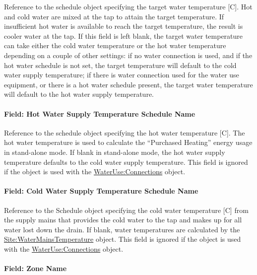 Reference to the schedule object specifying the target water temperature {[}C{]}. Hot and cold water are mixed at the tap to attain the target temperature. If insufficient hot water is available to reach the target temperature, the result is cooler water at the tap. If this field is left blank, the target water temperature can take either the cold water temperature or the hot water temperature depending on a couple of other settings: if no water connection is used, and if the hot water schedule is not set, the target temperature will default to the cold water supply temperature; if there is water connection used for the water use equipment, or there is a hot water schedule present, the target water temperature will default to the hot water supply temperature.

\paragraph{Field: Hot Water Supply Temperature Schedule Name}\label{field-hot-water-supply-temperature-schedule-name}

Reference to the schedule object specifying the hot water temperature {[}C{]}. The hot water temperature is used to calculate the ``Purchased Heating'' energy usage in stand-alone mode. If blank in stand-alone mode, the hot water supply temperature defaults to the cold water supply temperature. This field is ignored if the object is used with the \hyperref[wateruseconnections]{WaterUse:Connections} object.

\paragraph{Field: Cold Water Supply Temperature Schedule Name}\label{field-cold-water-supply-temperature-schedule-name-000}

Reference to the Schedule object specifying the cold water temperature {[}C{]} from the supply mains that provides the cold water to the tap and makes up for all water lost down the drain. If blank, water temperatures are calculated by the \hyperref[sitewatermainstemperature]{Site:WaterMainsTemperature} object. This field is ignored if the object is used with the \hyperref[wateruseconnections]{WaterUse:Connections} object.

\paragraph{Field: Zone Name}\label{field-zone-name-013}

